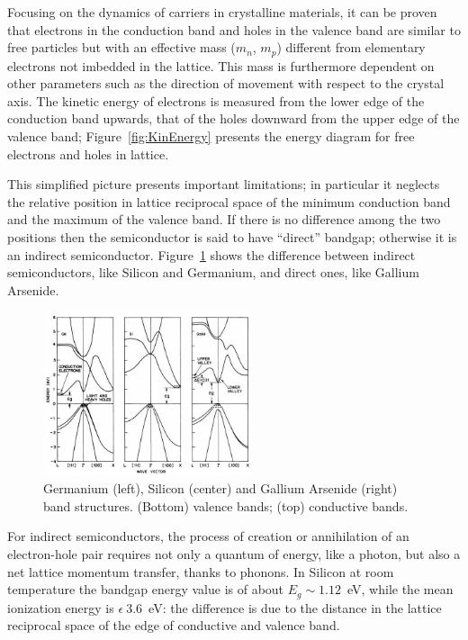 Focusing on the dynamics of carriers in crystalline materials, it can be proven that  electrons in the 
conduction band and holes in the valence band are similar to free particles  but with an effective mass 
($m_n$, $m_p$) different from elementary electrons not imbedded in the lattice.
This mass is furthermore dependent on other parameters such as the direction of movement with 
respect to the crystal axis. The kinetic energy of electrons is measured from the lower edge of the 
conduction band upwards, that of the holes downward from the upper edge of the valence band; 
Figure~\ref{fig:KinEnergy} presents the energy diagram for free electrons and holes in lattice.

This simplified picture presents important limitations; in particular it neglects the relative position 
in lattice reciprocal space of the minimum conduction band and the maximum of the valence band. 
If there is no difference among the two positions then the semiconductor is said to have ``direct'' 
bandgap; otherwise it is an indirect semiconductor. Figure~\ref{fig:bandStructures} shows the difference 
between indirect semiconductors, like Silicon and Germanium, and direct ones, like Gallium Arsenide. 


 \begin{figure}[htbp]
   \centering
   \includegraphics[width=0.55\textwidth]{bandStructures.jpg} %
   \caption{\label{fig:bandStructures}Germanium (left), Silicon (center) and Gallium Arsenide (right) band structures. (Bottom) valence bands; (top) conductive bands.}
\end{figure}

For indirect semiconductors, the process of creation or annihilation of an electron-hole pair requires 
not only a quantum of energy, like a photon, but also a net lattice momentum transfer, thanks to 
phonons. In Silicon at room temperature the bandgap energy value is of about $E_g\sim1.12$~eV, 
while the mean ionization energy is $\epsilon~3.6$~eV: the difference is due to the distance in the 
lattice reciprocal space of the edge of conductive and valence band. 


